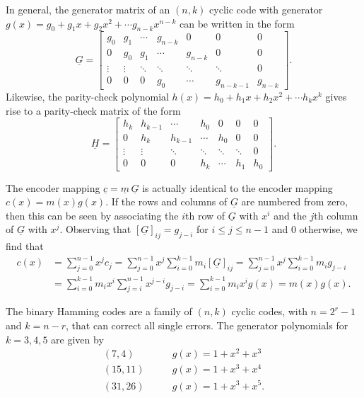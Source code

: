 In general, the generator matrix of an $(n,k)$ cyclic code with generator $g(x)=g_0 + g_1 x + g_2 x^2 + \cdots g_{n-k} x^{n-k}$ can be written in the form
\[ \underline{G} = \left[ \begin{array}{ccccccc}
g_0 & g_1 & \cdots & g_{n-k} & 0 & 0 & 0 \\
0 & g_0 & g_1 & \cdots & g_{n-k} & 0 & 0 \\
\vdots & \vdots & \ddots & \ddots & \ddots & \ddots & 0 \\
0 & 0 & 0 & g_0 & \cdots & g_{n-k-1} & g_{n-k} \end{array} \right]. \]
Likewise, the parity-check polynomial $h(x) = h_0 + h_1 x + h_2 x^2 + \cdots h_{k} x^k$ gives rise to a parity-check matrix of the form
\[ \underline{H} = \left[ \begin{array}{ccccccc}
h_k & h_{k-1} & \cdots & h_0 & 0 & 0 & 0 \\
0 & h_k & h_{k-1} & \cdots & h_0 & 0 & 0 \\
\vdots & \vdots & \ddots & \ddots & \ddots & \ddots & 0 \\
0 & 0 & 0 & h_k & \cdots & h_1 & h_0 \end{array} \right]. \]

The encoder mapping $\underline{c} = \underline{m} \, \underline{G}$ is actually identical to the encoder mapping $c(x) = m(x) g(x)$.
If the rows and columns of $\underline{G}$ are numbered from zero, then this can be seen by associating the $i$th row of $\underline{G}$ with $x^i$ and the $j$th column of $\underline{G}$ with $x^j$.
Observing that $[\underline{G}]_{ij} = g_{j-i}$ for $i \leq j \leq n-1$ and 0 otherwise, we find that
\begin{align*}
c(x)
&= \sum_{j=0}^{n-1} x^j c_j 
= \sum_{j=0}^{n-1} x^j \sum_{i=0}^{k-1} m_i [\underline{G}]_{ij} 
= \sum_{j=0}^{n-1} x^j \sum_{i=0}^{k-1} m_i g_{j-i} \\
&= \sum_{i=0}^{k-1} m_i x^i \sum_{j=i}^{n-1} x^{j-i} g_{j-i} 
= \sum_{i=0}^{k-1} m_i x^i g(x) 
= m(x) g(x).
\end{align*}

\begin{example}
The binary Hamming codes are a family of $(n,k)$ cyclic codes, with $n=2^r - 1$ and $k=n-r$, that can correct all single errors.
The generator polynomials for $k=3,4,5$ are given by
\begin{align*}
(7,4) & \quad \quad g(x) = 1+x^2+x^3 \\
(15,11) & \quad \quad g(x) = 1+x^3+x^4 \\
(31,26) & \quad \quad g(x) = 1+x^3+x^5.
\end{align*}
\end{example}

